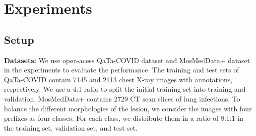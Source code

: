 \documentclass{article}
\begin{document}
\vspace{-3mm}
\section{Experiments}
\label{sec:experiments}
\vspace{-3mm}
\subsection{Setup}
\vspace{-2mm}
\noindent\textbf{Datasets:} We use open-acess QaTa-COVID dataset \cite{yamac2021convolutional} and MosMedData+ dataset \cite{morozov2020mosmeddata,COVID-19-CT} in the experiments to evaluate the performance. The training and test sets of QaTa-COVID contain 7145 and 2113 chest X-ray images with annotations, respectively. We use a 4:1 ratio to split the initial training set into training and validation. MosMedData+ contains 2729 CT scan slices of lung infections. To balance the different morphologies of the lesion, we consider the images with four prefixes as four classes. For each class, we distribute them in a ratio of 8:1:1 in the training set, validation set, and test set.
\end{document}
